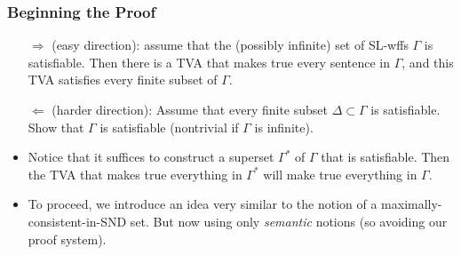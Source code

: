 \begin{frame}
\frametitle{Beginning the Proof}

\begin{itemize}[<+->]

\item[$\Rightarrow$] (easy direction): assume that the (possibly infinite) set of SL-wffs $\Gamma$ is satisfiable. Then there is a TVA that makes true every sentence in $\Gamma$, and this TVA satisfies every finite subset of $\Gamma$.

\item[$\Leftarrow$] (harder direction): Assume that every finite subset $\Delta \subset \Gamma$ is satisfiable. Show that $\Gamma$ is satisfiable (nontrivial if $\Gamma$ is infinite).

\item Notice that it suffices to construct a superset $\Gamma^{\ast}$ of $\Gamma$ that is satisfiable. Then the TVA that makes true everything in $\Gamma^{\ast}$ will make true everything in $\Gamma$.

\item To proceed, we introduce an idea very similar to the notion of a maximally-consistent-in-SND set. But now using only \textit{semantic} notions (so avoiding our proof system). 

\end{itemize}
\end{frame}

